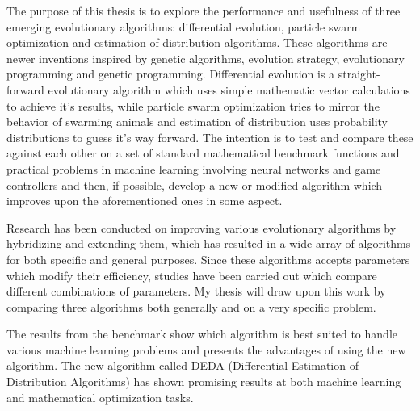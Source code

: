The purpose of this thesis is to explore the performance and usefulness of three emerging evolutionary algorithms: differential evolution, particle swarm optimization and estimation of distribution algorithms. These algorithms are newer inventions inspired by genetic algorithms, evolution strategy, evolutionary programming and genetic programming. Differential evolution is a straight-forward evolutionary algorithm which uses simple mathematic vector calculations to achieve it's results, while particle swarm optimization tries to mirror the behavior of swarming animals and estimation of distribution uses probability distributions to guess it's way forward. The intention is to test and compare these against each other on a set of standard mathematical benchmark functions and practical problems in machine learning involving neural networks and game controllers and then, if possible, develop a new or modified algorithm which improves upon the aforementioned ones in some aspect.

Research has been conducted on improving various evolutionary algorithms by hybridizing and extending them, which has resulted in a wide array of algorithms for both specific and general purposes. Since these algorithms accepts parameters which modify their efficiency, studies have been carried out which compare different combinations of parameters. My thesis will draw upon this work by comparing three algorithms both generally and on a very specific problem.

The results from the benchmark show which algorithm is best suited to handle various machine learning problems and presents the advantages of using the new algorithm. The new algorithm called DEDA (Differential Estimation of Distribution Algorithms) has shown promising results at both machine learning and mathematical optimization tasks.

